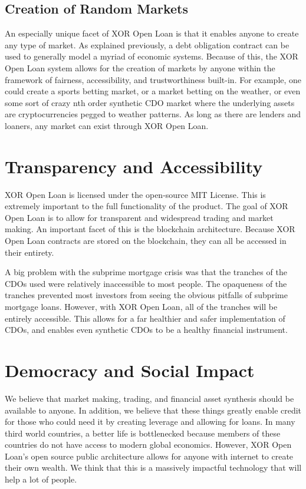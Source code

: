 \documentclass[twoside]{article}
\begin{document}
\subsection{Creation of Random Markets}
An especially unique facet of XOR Open Loan is that it enables anyone to create any type of market. As explained previously, a debt obligation contract can be used to generally model a myriad of economic systems. Because of this, the XOR Open Loan system allows for the creation of markets by anyone within the framework of fairness, accessibility, and trustworthiness built-in. For example, one could create a sports betting market, or a market betting on the weather, or even some sort of crazy nth order synthetic CDO market where the underlying assets are cryptocurrencies pegged to weather patterns. As long as there are lenders and loaners, any market can exist through XOR Open Loan. 

\section{Transparency and Accessibility}
XOR Open Loan is licensed under the open-source MIT License. This is extremely important to the full functionality of the product. The goal of XOR Open Loan is to allow for transparent and widespread trading and market making. An important facet of this is the blockchain architecture. Because XOR Open Loan contracts are stored on the blockchain, they can all be accessed in their entirety. 

A big problem with the subprime mortgage crisis was that the tranches of the CDOs used were relatively inaccessible to most people. The opaqueness of the tranches prevented most investors from seeing the obvious pitfalls of subprime mortgage loans. However, with XOR Open Loan, all of the tranches will be entirely accessible. This allows for a far healthier and safer implementation of CDOs, and enables even synthetic CDOs to be a healthy financial instrument. 

\section{Democracy and Social Impact}
We believe that market making, trading, and financial asset synthesis should be available to anyone. In addition, we believe that these things greatly enable credit for those who could need it by creating leverage and allowing for loans. In many third world countries, a better life is bottlenecked because members of these countries do not have access to modern global economics. However, XOR Open Loan's open source public architecture allows for anyone with internet to create their own wealth. We think that this is a massively impactful technology that will help a lot of people. 
\end{document}
